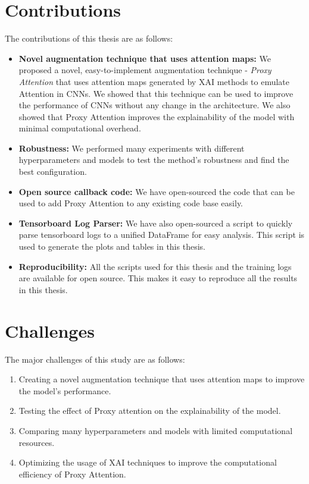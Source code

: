 \documentclass[a4paper,11pt,openright]{book}
\begin{document}
\section{Contributions}
The contributions of this thesis are as follows:
\begin{itemize}
    \item \textbf{Novel augmentation technique that uses attention maps: } We proposed a novel, easy-to-implement augmentation technique - \textit{Proxy Attention} that uses attention maps generated by XAI methods to emulate Attention in CNNs. We showed that this technique can be used to improve the performance of CNNs without any change in the architecture. We also showed that Proxy Attention improves the explainability of the model with minimal computational overhead.
    \item \textbf{Robustness: } We performed many experiments with different hyperparameters and models to test the method's robustness and find the best configuration. 
    \item \textbf{Open source callback code: } We have open-sourced the code that can be used to add Proxy Attention to any existing code base easily.
    \item \textbf{Tensorboard Log Parser: } We have also open-sourced a script to quickly parse tensorboard logs to a unified DataFrame for easy analysis. This script is used to generate the plots and tables in this thesis.
    \item \textbf{Reproducibility: } All the scripts used for this thesis and the training logs are available for open source. This makes it easy to reproduce all the results in this thesis.
\end{itemize}


\section{Challenges}
The major challenges of this study are as follows:
\begin{enumerate}
    \item Creating a novel augmentation technique that uses attention maps to improve the model's performance.
    \item Testing the effect of Proxy attention on the explainability of the model.
    \item Comparing many hyperparameters and models with limited computational resources.
    \item Optimizing the usage of XAI techniques to improve the computational efficiency of Proxy Attention.
\end{enumerate}
\end{document}
